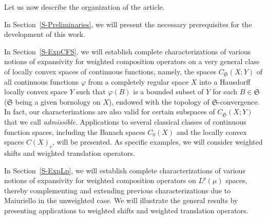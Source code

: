 \documentclass[12pt]{article}
\theoremstyle{plain}
\theoremstyle{definition}
\newcommand{\fS}{\mathfrak{S}}
\begin{document}
Let us now describe the organization of the article.

In Section~\ref{S-Preliminaries}, we will present the necessary prerequisites for the development of this work.

In Section~\ref{S-ExpCFS}, we will establish complete characterizations of various notions of expansivity 
for weighted composition operators on a very general class of locally convex spaces of continuous functions, 
namely, the spaces $C_\fS(X;Y)$ of all continuous functions $\varphi$ from a completely regular space $X$ 
into a Hausdorff locally convex space $Y$ such that $\varphi(B)$ is a bounded
subset of $Y$ for each $B \in \fS$ ($\fS$ being a given bornology on $X$), endowed with the topology of $\fS$-convergence.
In fact, our characterizations are also valid for certain subspaces of $C_\fS(X;Y)$ that we call {\em admissible}.
Applications to several classical classes of continuous function spaces, including the Banach spaces $C_0(X)$ and the locally convex spaces $C(X)_c$, will be presented.
As specific examples, we will consider weighted shifts and weighted translation operators.

In Section~\ref{S-ExpLp}, we will establish complete characterizations of various notions of expansivity for weighted composition operators on $L^p(\mu)$ spaces, thereby complementing and extending previous characterizations due to Maiuriello \cite{MMai22} in the unweighted case. We will illustrate the general results by presenting applications to weighted shifts and weighted translation operators.
\end{document}
